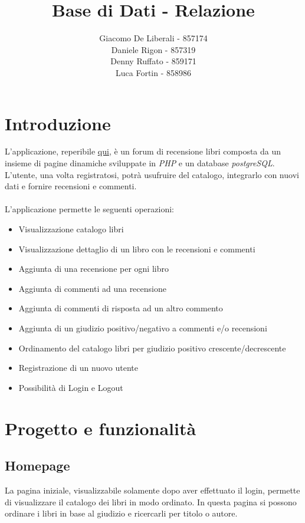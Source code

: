 \documentclass[italian]{article}
\author{
	Giacomo De Liberali - 857174\\
	Daniele Rigon - 857319 \\
	Denny Ruffato - 859171 \\
	Luca Fortin - 858986
}
\begin{document}
	
\title{Base di Dati - Relazione}
\maketitle

\tableofcontents
\pagebreak

\section{Introduzione}
L’applicazione, reperibile \href{http://wwwstud.dsi.unive.it/druffato/bd2017/}{qui}, è un forum di recensione libri composta da un insieme di pagine dinamiche sviluppate in \textit{PHP} e un database \textit{postgreSQL}. L'utente, una volta registratosi, potrà usufruire del catalogo, integrarlo con nuovi dati e fornire recensioni e commenti. \\\\

\noindent
L'applicazione permette le seguenti operazioni:
\begin{itemize}
	\item Visualizzazione catalogo libri
	\item Visualizzazione dettaglio di un libro con le recensioni e commenti
	\item Aggiunta di una recensione per ogni libro
	\item Aggiunta di commenti ad una recensione
	\item Aggiunta di commenti di risposta ad un altro commento
	\item Aggiunta di un giudizio positivo/negativo a commenti e/o recensioni
	\item Ordinamento del catalogo libri per giudizio positivo crescente/decrescente
	\item Registrazione di un nuovo utente
	\item Possibilità di Login e Logout
\end{itemize}
\section{Progetto e funzionalità}
\subsection{Homepage}
La pagina iniziale, visualizzabile solamente dopo aver effettuato il login, permette di visualizzare il catalogo dei libri in modo ordinato.
In questa pagina si possono ordinare i libri in base al giudizio e ricercarli per titolo o autore.
\end{document}
